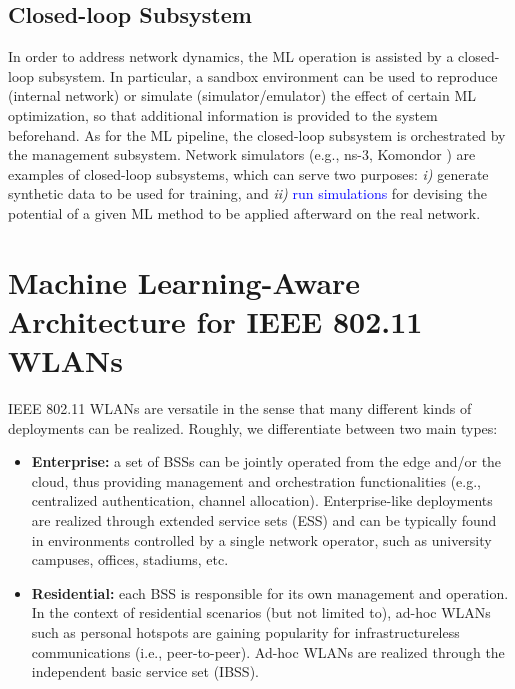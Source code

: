 \documentclass[journal]{IEEEtran}
\begin{document}
\subsection{Closed-loop Subsystem} 
In order to address network dynamics, the ML operation is assisted by a closed-loop subsystem. In particular, a sandbox environment can be used to reproduce (internal network) or simulate (simulator/emulator) the effect of certain ML optimization, so that additional information is provided to the system beforehand. As for the ML pipeline, the closed-loop subsystem is orchestrated by the management subsystem. Network simulators (e.g., ns-3, Komondor \cite{barrachina2019komondor}) are examples of closed-loop subsystems, which can serve two purposes: \emph{i)} generate synthetic data to be used for training, and \emph{ii)} \textcolor{blue}{run simulations} for devising the potential of a given ML method to be applied afterward on the real network.

\section{Machine Learning-Aware Architecture for IEEE 802.11 WLANs}
\label{section:wlans_architecture}

IEEE 802.11 WLANs are versatile in the sense that many different kinds of deployments can be realized. Roughly, we differentiate between two main types:
\begin{itemize}
	\item \textbf{Enterprise:} a set of BSSs can be jointly operated from the edge and/or the cloud, thus providing management and orchestration functionalities (e.g., centralized authentication, channel allocation). Enterprise-like deployments are realized through extended service sets (ESS) and can be typically found in environments controlled by a single network operator, such as university campuses, offices, stadiums, etc. 
	\item \textbf{Residential:} each BSS is responsible for its own management and operation. In the context of residential scenarios (but not limited to), ad-hoc WLANs such as personal hotspots are gaining popularity for infrastructureless communications (i.e., peer-to-peer). Ad-hoc WLANs are realized through the independent basic service set (IBSS).
\end{itemize}
\end{document}
